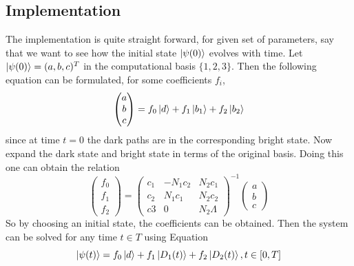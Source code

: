 \subsection{Implementation}
The implementation is quite straight forward, for given set of parameters, say that we want to see how the initial state $\ket{\psi(0)}$ evolves with time.
Let $\ket{\psi(0)} = (a,b,c)^T$ in the computational basis $\{1,2,3\}$. Then the following equation can be formulated, for some coefficients $f_i$,
\begin{equation}
\begin{pmatrix}
a\\
b\\
c
\end{pmatrix}
= f_0 \ket{d} + f_1\ket{b_1} + f_2\ket{b_2}
\end{equation}
since at time $t = 0$ the dark paths are in the corresponding bright state.
Now expand the dark state and bright state in terms of the original basis. Doing this one can obtain the relation
\begin{equation}
\begin{pmatrix}
f_0\\
f_1\\
f_2
\end{pmatrix} = \begin{pmatrix}
c_1 & -N_1 c_2 & N_2 c_1
\\
c_2 & N_1 c_1 & N_2 c_2
\\
c3 & 0 & N_2 \Lambda
\end{pmatrix}^{-1}\begin{pmatrix}
a\\
b\\
c
\end{pmatrix}
\end{equation}
So by choosing an initial state, the coefficients can be obtained.
Then the system can be solved for any time $t \in T$ using Equation 
\begin{equation}
\label{eq:expl-time}
\ket{\psi(t)} = f_0\ket{d} + f_1\ket{D_1(t)} + f_2\ket{D_2(t)}, t \in [0,T]
\end{equation}


